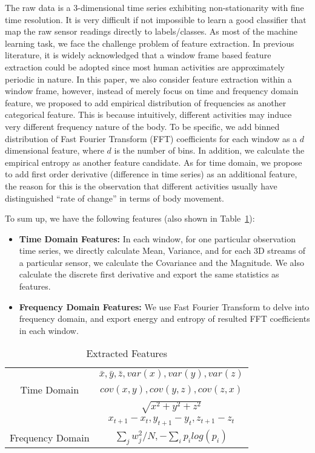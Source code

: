 The raw data is a 3-dimensional time series exhibiting non-stationarity with fine time resolution. It is very difficult if not impossible to learn a good classifier that map the raw sensor readings directly to labels/classes. As most of the machine learning task, we face the challenge problem of feature extraction. In previous literature, it is widely acknowledged that a window frame based feature extraction could be adopted since most human activities are approximately periodic in nature. In this paper, we also consider feature extraction within a window frame, however, instead of merely focus on time and frequency domain feature, we proposed to add empirical distribution of frequencies as another categorical feature. This is because intuitively, different activities may induce very different frequency nature of the body. To be specific, we add binned distribution of Fast Fourier Transform (FFT) coefficients for each window as a $d$ dimensional feature, where $d$ is the number of bins. In addition, we calculate the empirical entropy as another feature candidate. As for time domain, we propose to add first order derivative (difference in time series) as an additional feature, the reason for this is the observation that different activities usually have distinguished ``rate of change'' in terms of body movement.

To sum up, we have the following features (also shown in Table~\ref{tab:feature1}):
\begin{itemize}
\item \textbf{Time Domain Features:} In each window, for one particular observation time series, we directly calculate Mean, Variance, and for each 3D streams of a particular sensor, we calculate the Covariance and the Magnitude. We also calculate the discrete first derivative and export the same statistics as features. 
\item \textbf{Frequency Domain Features:} We use Fast Fourier Transform to delve into frequency domain, and export energy and entropy of resulted FFT coefficients in each window.
\end{itemize}

\begin{table}
  \centering
  \begin{tabular}{c|c}
    \hline
    & $\bar{x}, \bar{y}, \bar{z}, var(x), var(y), var(z)$\\
    Time Domain  & $cov(x,y), cov(y,z), cov(z,x)$\\
    &$\sqrt{x^2+y^2+z^2}$\\
    & $x_{t+1}-x_{t}, y_{t+1}-y_{t}, z_{t+1}-z_{t}$\\
    \hline
    Frequency Domain  & $\sum_j w_j^2/N, -\sum_i p_ilog(p_i)$  \\
    \hline
  \end{tabular}
  \caption{Extracted Features}
  \label{tab:feature1}
\end{table}


